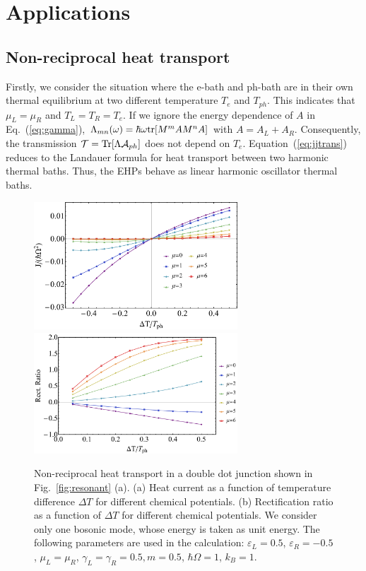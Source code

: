 \documentclass[aps,prb,
,floatfix,footinbib,shortbibliography,
preprint
]{revtex4-1}
\newcommand{\revision}[1]{{\color{blue}{#1}}}
\begin{document}
\section{Applications}
\subsection{Non-reciprocal heat transport}
Firstly, we consider the situation where the e-bath and ph-bath are in their own thermal equilibrium at two different temperature $T_e$ and $T_{ph}$. This indicates that  $\mu_{L}=\mu_{R}$ and $T_{L}=T_R=T_e$. 
If we ignore the energy dependence of $A$ in Eq.~(\ref{eq:gamma}),
$\Lambda_{mn}(\omega)=\hbar\omega{\rm tr}[M^m A M^n A]$
with $A=A_L+A_R$. Consequently,  the transmission $\mathcal{T}={\rm Tr}[\Lambda\mathcal{A}_{ph}]$ does not depend on $T_e$. Equation~(\ref{eq:jjtrans}) reduces to the Landauer formula for heat transport between two harmonic thermal baths. Thus, the EHPs behave as linear harmonic oscillator thermal baths. 


\begin{figure}[]
	\includegraphics[width=3in,angle=0]{figures-0208/fig_3.pdf}
	\includegraphics[width=3in,angle=0]{figures-0208/fig_3r.pdf}	
	\caption{Non-reciprocal heat transport in a  double dot junction shown in Fig.~\ref{fig:resonant} (a). (a) Heat current as a function of temperature difference $\Delta T$ for different chemical potentials. (b) Rectification ratio as a function of $\Delta T$ for different chemical potentials. We consider only one bosonic mode, whose energy is taken as unit energy. The following parameters are used in the calculation: $\varepsilon_L=0.5$, $\varepsilon_R=-0.5$, $\mu_L=\mu_R$, $\gamma_L=\gamma_R=0.5,m=0.5$, $\hbar\Omega=1$, $k_B=1$. }
	\label{fig:JT}
\end{figure}
\end{document}
